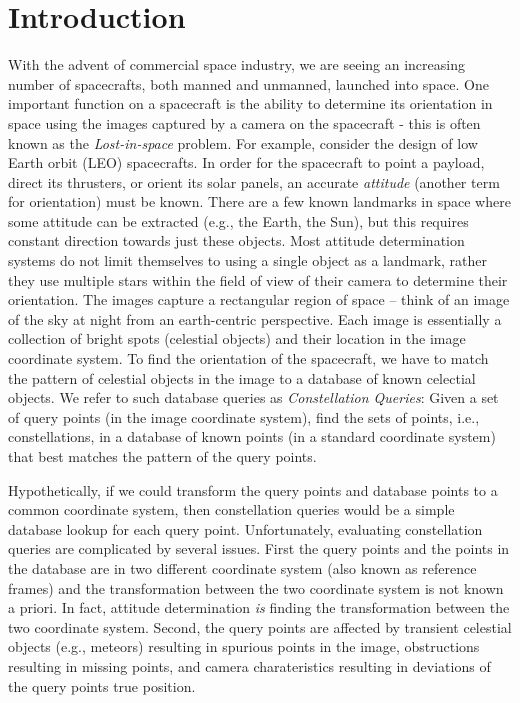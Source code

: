 \section{Introduction}\label{sec:introduction}
With the advent of commercial space industry, we are seeing
an increasing number of spacecrafts, both manned and unmanned,
launched into space. One important function on a spacecraft
is the ability to determine its orientation in space using
the images captured by a camera on the spacecraft - this is
often known as the \textit{Lost-in-space} problem.
For example, consider the design of low Earth
orbit (LEO) spacecrafts. In order for the spacecraft to
point a payload, direct its thrusters, or orient its solar
panels, an accurate \textit{attitude} (another term for
orientation) must be known. There are a few known landmarks
in space where some attitude can be extracted (e.g., the
Earth, the Sun), but this requires constant direction
towards just these objects. Most attitude determination
systems do not limit themselves to using a single object as
a landmark, rather they use multiple stars within the
field of view of their camera to determine their orientation.
The images capture a rectangular region of space -- think of an image of the
sky at night from an earth-centric perspective. Each image is essentially a
collection of
bright spots (celestial objects) and their location in the
image coordinate system. To find the orientation of the
spacecraft, we have to match the pattern of celestial
objects in the image to a database of known celectial
objects. We refer to such database queries as 
\textit{Constellation Queries}: Given a set of query points (in
the image coordinate system), find the sets of points, i.e.,
constellations, in a database of known points (in a standard
coordinate system) that best matches the pattern of the
query points. 

Hypothetically, if we could transform the
query points and database points to a common coordinate
system, then constellation queries would be a simple
database lookup for each query point. Unfortunately,
evaluating constellation queries are complicated by several
issues. First the query points and the points in the
database are in two different coordinate system (also known
as reference frames) and the transformation between the two
coordinate system is not known a priori. In fact, attitude
determination \emph{is} finding the transformation between
the two coordinate system. Second, the query
points are affected by transient celestial objects (e.g.,
meteors) resulting in spurious points in the image,
obstructions resulting in missing points, and camera
charateristics resulting in deviations of the query points
true position.

